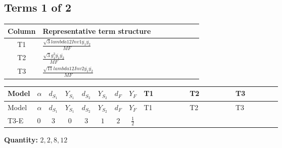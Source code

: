\documentclass[8pt]{article}
\begin{document}
\begin{landscape}
\subsection*{Terms 1 of 2}
\begin{center}
\begin{tabular}{@{}c >{\raggedright\arraybackslash}p{0.82\linewidth}@{}}
\toprule
Column & Representative term structure \\
\midrule
T1 & \(\displaystyle \frac{\sqrt{3} lambda12Inv1 \overline{y_{1}} \overline{y_{2}}}{MF}\) \\
\midrule
T2 & \(\displaystyle \frac{\sqrt{3} g_{1}^{2} \overline{y_{1}} \overline{y_{2}}}{MF}\) \\
\midrule
T3 & \(\displaystyle \frac{\sqrt{11} lambda12Inv2 \overline{y_{1}} \overline{y_{2}}}{MF}\) \\
\midrule
\bottomrule
\end{tabular}
\end{center}
\smallskip
\tiny
\begin{longtable}{@{}llcccccc >{\raggedright\arraybackslash}p{0.21\linewidth} >{\raggedright\arraybackslash}p{0.21\linewidth} >{\raggedright\arraybackslash}p{0.21\linewidth}@{}}
\toprule
Model & $\alpha$ & $d_{S_1}$ & $Y_{S_1}$ & $d_{S_2}$ & $Y_{S_2}$ & $d_F$ & $Y_F$ & T1 & T2 & T3 \\
\midrule
\endfirsthead
\toprule
Model & $\alpha$ & $d_{S_1}$ & $Y_{S_1}$ & $d_{S_2}$ & $Y_{S_2}$ & $d_F$ & $Y_F$ & T1 & T2 & T3 \\
\midrule
\endhead
T3-E & $0$ & $3$ & $0$ & $3$ & $1$ & $2$ & $\frac{1}{2}$ & \scriptsize\adjustbox{max width=\linewidth}{$\begin{gathered} - \frac{\sqrt{3} lambda12Inv1 \overline{y_{1}} \overline{y_{2}}}{6 MF}\end{gathered}$} & \scriptsize\adjustbox{max width=\linewidth}{$\begin{gathered} \frac{\sqrt{3} g_{1}^{2} \overline{y_{1}} \overline{y_{2}}}{8 MF}\end{gathered}$} & \scriptsize\adjustbox{max width=\linewidth}{$\begin{gathered} \frac{3 \sqrt{11} lambda12Inv2 \overline{y_{1}} \overline{y_{2}}}{22 MF}\end{gathered}$} \\
\midrule
\bottomrule
\end{longtable}
\clearpage
\noindent\textbf{Quantity: }$\mathrm{2,2,8,12}$\par\smallskip

\end{landscape}
\end{document}
